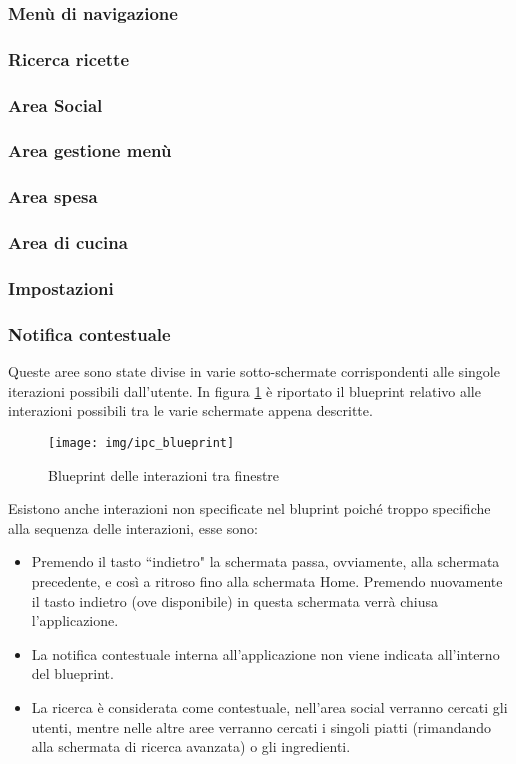 \subsubsection{Menù di navigazione}
\subsubsection{Ricerca ricette}
\subsubsection{Area Social}
\subsubsection{Area gestione menù}
\subsubsection{Area spesa}
\subsubsection{Area di cucina}
\subsubsection{Impostazioni}
\subsubsection{Notifica contestuale}

Queste aree sono state divise in varie sotto-schermate corrispondenti alle
singole iterazioni possibili dall'utente.  In figura \ref{fig:blueprint}
è riportato il blueprint relativo alle interazioni possibili tra le varie schermate appena descritte.
\begin{figure}[H]
	\centering
	\caption{Blueprint delle interazioni tra finestre}
	\texttt{[image: img/ipc\_blueprint]}
	\label{fig:blueprint}
\end{figure}
Esistono anche interazioni non specificate nel bluprint poiché troppo specifiche
alla sequenza delle interazioni, esse sono:
\begin{itemize}
	\item Premendo il tasto ``indietro" la schermata passa, ovviamente, alla
	schermata precedente, e così a ritroso fino alla schermata Home.
	Premendo nuovamente il tasto indietro (ove disponibile) in questa
	schermata verrà chiusa l'applicazione.
	\item La notifica contestuale interna all'applicazione non viene
	indicata all'interno del blueprint.
	\item La ricerca è considerata come contestuale, nell'area social
	verranno cercati gli utenti, mentre nelle altre aree verranno cercati i
	singoli piatti (rimandando alla schermata di ricerca avanzata)
	o gli ingredienti.
\end{itemize}
